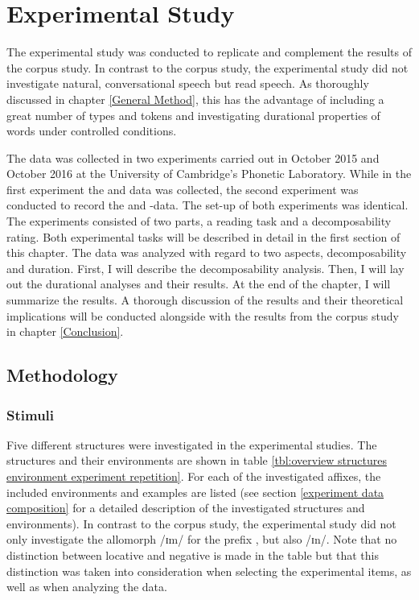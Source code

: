 \chapter{Experimental Study} \label{Experimental Studies}


The experimental study was conducted to replicate and complement the results of the corpus study. In contrast to the corpus study, the experimental study did not investigate natural, conversational speech but read speech. As thoroughly discussed in chapter \ref{General Method}, this has the advantage of including a great number of types and tokens and investigating durational properties of words under controlled conditions.

 The data was collected in two experiments carried out in October 2015 and October 2016 at the University of Cambridge's Phonetic Laboratory. While in the first experiment the  and data was collected, the second experiment was conducted to record the  and -data. 
  The set-up of both experiments was identical. The experiments consisted of two parts, a reading task and a decomposability rating. 
 Both experimental tasks will be described in detail in the first section of this chapter.
 The data was analyzed with regard to two aspects, decomposability and duration. First, I will describe the decomposability analysis.  Then, I will lay out the durational analyses and their results. At the end of the chapter, I will summarize the results. A thorough discussion of the results and their theoretical implications will be conducted alongside with the results from the corpus study in chapter \ref{Conclusion}.



\section{Methodology}


\subsection{Stimuli} \label{stimuli experiment}

 Five different structures were investigated in the experimental studies. The structures and their environments are shown in table \ref{tbl:overview structures environment experiment repetition}. For each of the investigated affixes, the included environments and examples are listed (see section \ref{experiment data composition} for a detailed description of the investigated structures and environments). In contrast to the corpus study, the experimental study did not only investigate the allomorph /ɪm/ for the prefix , but also /ɪn/. Note that no distinction between locative and negative  is made in the table but that this distinction was taken into consideration when selecting the experimental items, as well as when analyzing the data.



